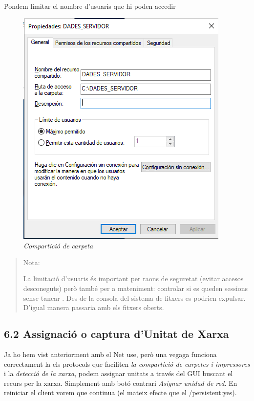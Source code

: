 \documentclass[
  a4paper,
]{article}
\begin{document}
Pondem limitar el nombre d'usuaris que hi poden accedir

\begin{figure}
\centering
\includegraphics{png/ADDS/Compartir2.png}
\caption{\emph{Compartició de carpeta}}
\end{figure}

\begin{quote}
Nota:

La limitació d'usuaris és important per raons de seguretat (evitar
accesos desconeguts) però també per a mateniment: controlar si es queden
sessions sense tancar . Des de la consola del sistema de fitxers es
podrien expulsar. D'igual manera passaria amb els fitxers oberts.
\end{quote}

\subsection{6.2 Assignació o captura d'Unitat de
Xarxa}\label{assignaciuxf3-o-captura-dunitat-de-xarxa}

Ja ho hem vist anteriorment amb el Net use, però una vegaga funciona
correctament la els protocols que faciliten \emph{la compartició de
carpetes i impressores} i la \emph{detecció de la xarxa}, podem assignar
unitats a través del GUI buscant el recurs per la xarxa. Simplement amb
botó contrari \emph{Asignar unidad de red}. En reiniciar el client vorem
que continua (el mateix efecte que el /persistent:yes).
\end{document}
